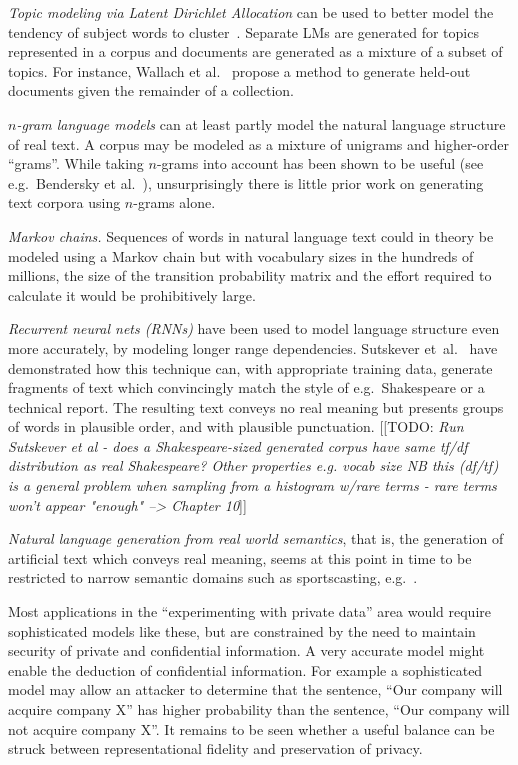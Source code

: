 \documentclass[11pt]{report}
\newcommand{\todo}[1]{{\color{blue}[[TODO: {\emph{#1}}]]}}
\begin{document}
\textit{Topic modeling via Latent Dirichlet Allocation} can be used to
better model the tendency of subject words to
cluster~\cite{blei2003latent}.  Separate LMs are generated for topics
represented in a corpus and documents are generated as a mixture of a
subset of topics.  For instance, Wallach et
al.~\cite{wallach2009evaluation} propose a method to generate held-out
documents given the remainder of a collection.

\textit{$n$-gram language models} can at least partly model the natural language
structure of real text.   A corpus may be modeled as a mixture of 
unigrams and higher-order ``grams''.  
While taking $n$-grams into account has been shown to be useful (see
e.g.~Bendersky et al.~\cite{bendersky2010learning}), unsurprisingly 
there is little prior work on
generating text corpora using $n$-grams alone.

\textit{Markov chains.}  Sequences of words in natural language text
could in theory be modeled using a Markov chain \cite{KemenySnell1960}
but with vocabulary sizes in the hundreds of millions, the size of
the transition probability matrix and the effort required to calculate
it would be prohibitively large.

\textit{Recurrent neural nets (RNNs)} have been used to
model language structure even more accurately, by modeling longer
range dependencies.  Sutskever et~al.~\cite{sutskeverMartensHinton2011generatingTraffic} have
demonstrated how this technique can, with appropriate training data,
generate fragments of text which convincingly match the style of
e.g.~Shakespeare or a technical report.  The resulting text conveys no
real meaning but presents groups of words in plausible order, and with
plausible punctuation.
\todo{Run Sutskever et al - does a Shakespeare-sized generated corpus
  have same tf/df distribution as real Shakespeare? Other properties e.g. vocab size
	NB this (df/tf) is a general problem when sampling from a
        histogram w/rare terms
        - rare terms won't appear "enough"  --> Chapter 10}


\textit{Natural language generation from real world semantics}, that is,
the generation of artificial text which conveys real meaning, seems at
this point in time to be restricted to narrow semantic domains such as
sportscasting, e.g.~\cite{ChenKimMooney2010}.

Most applications in the ``experimenting with private data'' area would require 
sophisticated models like these, but are constrained by the need to maintain
security of private and confidential information.  A very accurate
model might enable the deduction of confidential information.  For
example a sophisticated model may allow an attacker to determine that
the sentence, ``Our company will acquire company X'' has higher
probability than the sentence, ``Our company will not acquire company X''.
It remains to be seen whether a useful balance can be struck between
representational fidelity and preservation of privacy.
\end{document}
